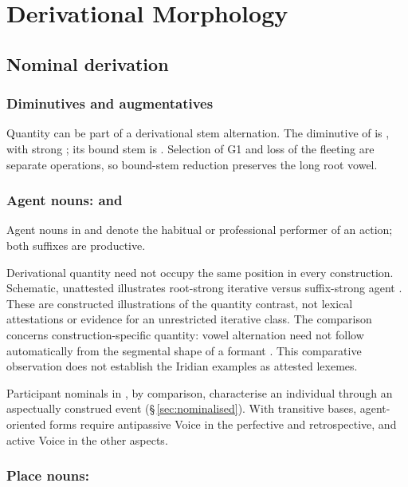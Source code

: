 \chapter{Derivational Morphology}\label{ch:derivational}


\section{Nominal derivation}

\subsection{Diminutives and augmentatives}

Quantity can be part of a derivational stem alternation. The diminutive of
 is , with strong ; its bound stem is
. Selection of G1 and loss of the fleeting  are separate
operations, so bound-stem reduction preserves the long root vowel.

\subsection{Agent nouns:  and }

Agent nouns in  and  denote the habitual or
professional performer of an action; both suffixes are productive.

Derivational quantity need not occupy the same position in every construction.
Schematic, unattested  illustrates root-strong iterative
 versus suffix-strong agent . These are constructed
illustrations of the quantity contrast, not lexical attestations or evidence
for an unrestricted iterative class.
The comparison concerns construction-specific quantity: vowel alternation
need not follow automatically from the segmental shape of a formant
\cite{akelaitiene1995}. This comparative observation does not establish the
Iridian examples as attested lexemes.

Participant nominals in , by comparison, characterise an individual
through an aspectually construed event (§\,\ref{sec:nominalised}). With
transitive bases, agent-oriented forms require antipassive Voice in the
perfective and retrospective, and active Voice in the other aspects.

\subsection{Place nouns: }



